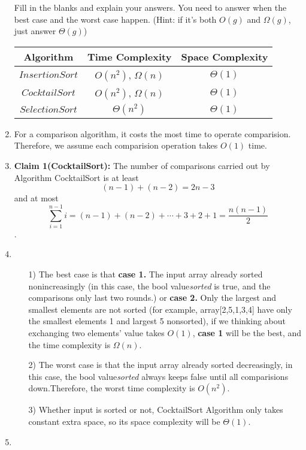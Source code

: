 \documentclass[12pt,a4paper]{article}
\makeatletter
\newtheorem*{solution}{Solution}
\theoremstyle{definition}
\renewenvironment{solution}[1][Solution] {\par\pushQED{\qed}\normalfont\topsep6\p@\@plus6\p@\relax\trivlist\item[\hskip\labelsep\bfseries#1\@addpunct{.}]\ignorespaces}{\popQED\endtrivlist\@endpefalse} \makeatother
\makeatother
\begin{document}
\begin{enumerate}
   
Fill in the blanks and explain your answers. You need to answer when the best case and the worst case happen. {\color{blue} (Hint: if it's both $O(g)$ and $\Omega(g)$, just answer $\Theta(g)$)}
\begin{table}[!h]

\label{Tab-compare}
	\centering
	\begin{tabular}{c|c| c }
		\toprule[2pt]
		\textbf{Algorithm} & \textbf{Time Complexity} & \textbf{Space Complexity} \\
		\hline
		\hline
		$InsertionSort$& $O(n^2)$, $\Omega(n)$  &  $\Theta(1)$  \\
		
		$CocktailSort$& $O(n^2)$, $\Omega(n)$  & $\Theta(1)$  \\

		$SelectionSort$ & $\Theta(n^2)$  & $\Theta(1)$  \\
		\bottomrule[2pt]


	\end{tabular}
\end{table}
    \begin{solution}
    \renewcommand{\qedsymbol}{}
        
        For a comparison algorithm, it costs the most time to operate comparision. Therefore, we assume each comparision operation takes 
        $O(1)$ time.\item
        \textbf{Claim 1(CocktailSort):} The number of comparisons carried out by Algorithm CocktailSort is at least $$(n-1)+(n-2) = 2n-3$$ and at most $$\sum_{i=1}^{n-1} i = (n-1)+(n-2)+\cdots +3+2+1 = \frac{n(n-1)}{2}$$.
        \item
        \begin{itemize}
        \item [1)]The best case is that \textbf{case 1.} The input array already sorted nonincreasingly (in this case, the bool value\textsl{sorted} is true, and the comparisons only last two rounds.) or \textbf{case 2.} Only the largest and smallest elements are not sorted (for example, array[2,5,1,3,4] have only the smallest elements 1 and largest 5 nonsorted), if we thinking about exchanging two elements' value takes $O(1)$, \textbf{case 1} will be the best, and the time complexity is $\Omega(n)$.\par
        \item [2)]The worst case is that the input array already sorted decreasingly, in this case, the bool value\textsl{sorted} always keeps false until all comparisions down.Therefore, the worst time complexity is $O(n^2)$.\par
        \item [3)]Whether input is sorted or not, CocktailSort Algorithm only takes constant extra space, so its space complexity will be $\Theta(1)$. 
        \end{itemize}
        \item


\end{solution}
\end{enumerate}
\end{document}
